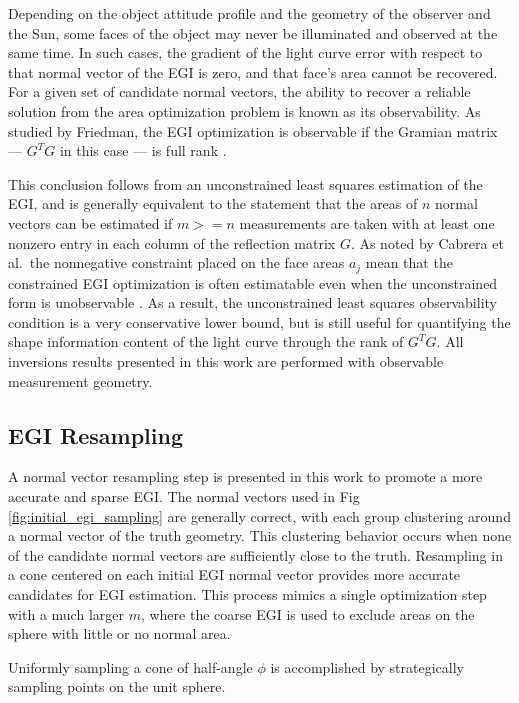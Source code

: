 Depending on the object attitude profile and the geometry of the observer and the Sun, some faces of the object may never be illuminated and observed at the same time. In such cases, the gradient of the light curve error with respect to that normal vector of the EGI is zero, and that face's area cannot be recovered. For a given set of candidate normal vectors, the ability to recover a reliable solution from the area optimization problem is known as its observability. As studied by Friedman, the EGI optimization is observable if the Gramian matrix --- $G^T G$ in this case --- is full rank \cite{friedman2020}.

This conclusion follows from an unconstrained least squares estimation of the EGI, and is generally equivalent to the statement that the areas of $n$ normal vectors can be estimated if $m>=n$ measurements are taken with at least one nonzero entry in each column of the reflection matrix $G$. As noted by Cabrera et al.\, the nonnegative constraint placed on the face areas $a_j$ mean that the constrained EGI optimization is often estimatable even when the unconstrained form is unobservable \cite{cabrera2021}. As a result, the unconstrained least squares observability condition is a very conservative lower bound, but is still useful for quantifying the shape information content of the light curve through the rank of $G^T G$. All inversions results presented in this work are performed with observable measurement geometry. 

\subsection{EGI Resampling}

A normal vector resampling step is presented in this work to promote a more accurate and sparse EGI. The normal vectors used in Fig \ref{fig:initial_egi_sampling} are generally correct, with each group clustering around a normal vector of the truth geometry. This clustering behavior occurs when none of the candidate normal vectors are sufficiently close to the truth. Resampling in a cone centered on each initial EGI normal vector provides more accurate candidates for EGI estimation. This process mimics a single optimization step with a much larger $m$, where the coarse EGI is used to exclude areas on the sphere with little or no normal area.

Uniformly sampling a cone of half-angle $\phi$ is accomplished by strategically sampling points on the unit sphere. 


